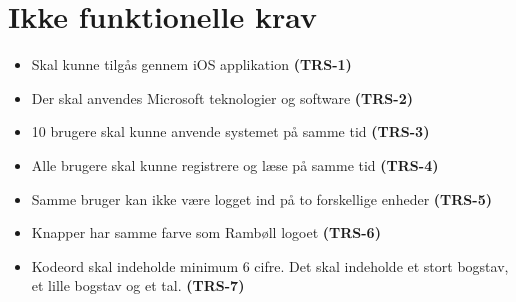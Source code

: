 \section{Ikke funktionelle krav} \label{sec:Ikkefunktionelle}
\begin{itemize}[-]
	\itemsep 0.3em 
	\item Skal kunne tilgås gennem iOS applikation \textbf{(TRS-1)}
	\item Der skal anvendes Microsoft teknologier og software \textbf{(TRS-2)}
	\item 10 brugere skal kunne anvende systemet på samme tid \textbf{(TRS-3)}
	\item Alle brugere skal kunne registrere og læse på samme tid \textbf{(TRS-4)}
	\item Samme bruger kan ikke være logget ind på to forskellige enheder \textbf{(TRS-5)}
	\item Knapper har samme farve som Rambøll logoet \textbf{(TRS-6)}
	\item Kodeord skal indeholde minimum 6 cifre. Det skal indeholde et stort bogstav, et lille bogstav og et tal. \textbf{(TRS-7)}
\end{itemize}

\clearpage